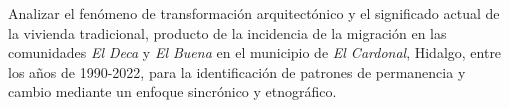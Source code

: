 
Analizar el fenómeno de transformación arquitectónico y el significado actual de la vivienda tradicional, producto de la incidencia de la migración en las comunidades \emph{El Deca} y \emph{El Buena} en el municipio de \emph{El Cardonal}, Hidalgo, entre los años de 1990-2022, para la identificación de patrones de permanencia y cambio mediante un enfoque sincrónico y etnográfico.
